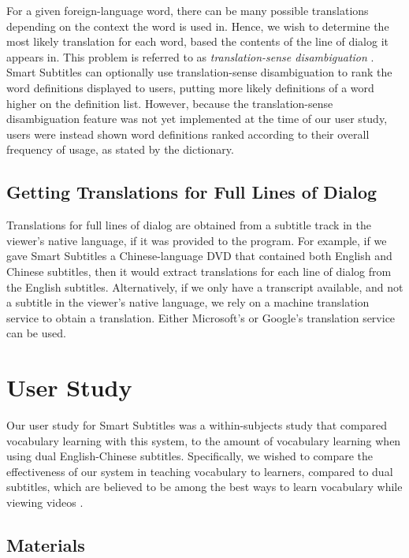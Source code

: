 \documentclass{sigchi}
\begin{document}
For a given foreign-language
word, there can be many possible translations depending on
the context the word is used in.
Hence, we wish to determine the most likely translation for each word,
based the contents of the line of dialog it appears in.
This problem is referred to as \emph{translation-sense disambiguation}
\cite{translationsense}.
Smart Subtitles can optionally use translation-sense disambiguation
to rank the word definitions displayed to users, putting
more likely definitions of a word higher on the definition list.
However, because the translation-sense disambiguation feature was not yet implemented at the time of our user study, users were instead shown word definitions ranked according to their overall frequency of usage,
as stated by the dictionary.

\subsection{Getting Translations for Full Lines of Dialog}

Translations for full lines of dialog are obtained from a subtitle track in the viewer's native language, if it was provided to 
the program. For example, if we gave Smart Subtitles a Chinese-language DVD
that contained both English and Chinese subtitles, then it would
extract translations for each line of dialog from the English subtitles.
Alternatively, if we only have a transcript available, and not a subtitle in the viewer's native language, we rely on a machine translation service to obtain a translation. Either Microsoft's or Google's translation service can be used.

\section{User Study}

Our user study for Smart Subtitles was a within-subjects study that compared vocabulary learning with this system, to the amount of vocabulary learning when using dual English-Chinese subtitles. Specifically, we wished to compare the effectiveness of our system in teaching vocabulary to learners, compared to dual subtitles, which are believed to be among the best ways to learn vocabulary while viewing videos \cite{raine2012incidental}.

\subsection{Materials}
\end{document}
